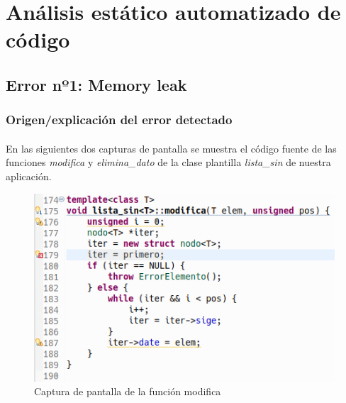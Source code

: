 \section{Análisis estático automatizado de código}

	\subsection{Error nº1: Memory leak}

		\subsubsection{Origen/explicación del error detectado}
		
			\paragraph{}En las siguientes dos capturas de pantalla se muestra el código fuente de las funciones \textit{modifica} y \textit{elimina\_dato} de la clase plantilla \textit{lista\_sin} de nuestra aplicación.
			
			\begin{figure}[H]
				\centering
				\includegraphics[scale=0.7]{img/captura42.png}
				\caption{Captura de pantalla de la función modifica}
				\label{captura42}
			\end{figure}
		
